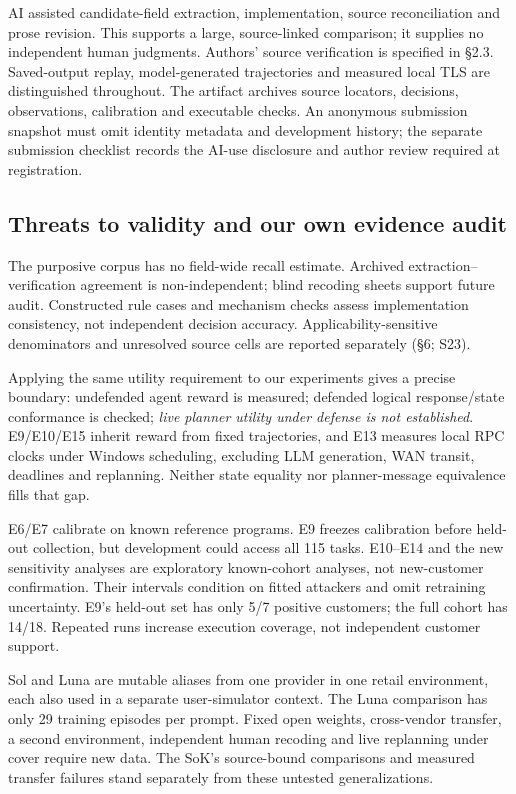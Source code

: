 AI assisted candidate-field extraction, implementation, source reconciliation and prose revision. This supports a large, source-linked comparison; it supplies no independent human judgments. Authors' source verification is specified in \S2.3. Saved-output replay, model-generated trajectories and measured local TLS are distinguished throughout. The artifact archives source locators, decisions, observations, calibration and executable checks. An anonymous submission snapshot must omit identity metadata and development history; the separate submission checklist records the AI-use disclosure and author review required at registration.

\subsection{Threats to validity and our own evidence audit}
The purposive corpus has no field-wide recall estimate. Archived extraction--verification agreement is non-independent; blind recoding sheets support future audit. Constructed rule cases and mechanism checks assess implementation consistency, not independent decision accuracy. Applicability-sensitive denominators and unresolved source cells are reported separately (\S6; S23).

Applying the same utility requirement to our experiments gives a precise boundary: undefended agent reward is measured; defended logical response/state conformance is checked; \emph{live planner utility under defense is not established}. E9/E10/E15 inherit reward from fixed trajectories, and E13 measures local RPC clocks under Windows scheduling, excluding LLM generation, WAN transit, deadlines and replanning. Neither state equality nor planner-message equivalence fills that gap.

E6/E7 calibrate on known reference programs. E9 freezes calibration before held-out collection, but development could access all 115 tasks. E10--E14 and the new sensitivity analyses are exploratory known-cohort analyses, not new-customer confirmation. Their intervals condition on fitted attackers and omit retraining uncertainty. E9's held-out set has only 5/7 positive customers; the full cohort has 14/18. Repeated runs increase execution coverage, not independent customer support.

Sol and Luna are mutable aliases from one provider in one retail environment, each also used in a separate user-simulator context. The Luna comparison has only 29 training episodes per prompt. Fixed open weights, cross-vendor transfer, a second environment, independent human recoding and live replanning under cover require new data. The SoK's source-bound comparisons and measured transfer failures stand separately from these untested generalizations.
